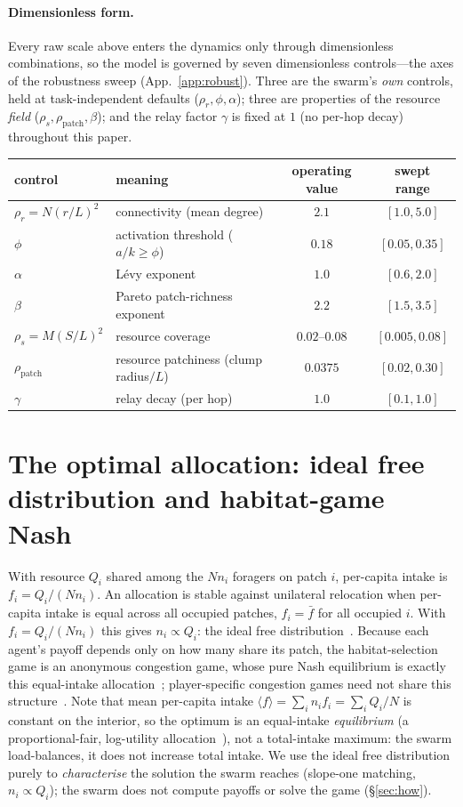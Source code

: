 \documentclass{article}
\begin{document}
\paragraph{Dimensionless form.} Every raw scale above enters the dynamics only through dimensionless
combinations, so the model is governed by seven dimensionless controls---the axes of the robustness sweep
(App.~\ref{app:robust}). Three are the swarm's \emph{own} controls, held at task-independent defaults
($\rho_r,\phi,\alpha$); three are properties of the resource \emph{field}
($\rho_s,\rho_{\mathrm{patch}},\beta$); and the relay factor $\gamma$ is fixed at $1$ (no per-hop decay)
throughout this paper.
\begin{center}{\small
\begin{tabular}{@{}llcc@{}}
\hline
control & meaning & operating value & swept range \\
\hline
$\rho_r=N(r/L)^2$ & connectivity (mean degree) & $2.1$ & $[1.0,5.0]$ \\
$\phi$ & activation threshold ($a/k\ge\phi$) & $0.18$ & $[0.05,0.35]$ \\
$\alpha$ & L\'evy exponent & $1.0$ & $[0.6,2.0]$ \\
$\beta$ & Pareto patch-richness exponent & $2.2$ & $[1.5,3.5]$ \\
$\rho_s=M(S/L)^2$ & resource coverage & $0.02$--$0.08$ & $[0.005,0.08]$ \\
$\rho_{\mathrm{patch}}$ & resource patchiness (clump radius$/L$) & $0.0375$ & $[0.02,0.30]$ \\
$\gamma$ & relay decay (per hop) & $1.0$ & $[0.1,1.0]$ \\
\hline
\end{tabular}}\end{center}

\section{The optimal allocation: ideal free distribution and habitat-game Nash}
\label{app:optimum}
With resource $Q_i$ shared among the $N n_i$ foragers on patch $i$, per-capita intake is $f_i=Q_i/(N n_i)$.
An allocation is stable against unilateral relocation when per-capita intake is equal across all occupied
patches, $f_i=\bar f$ for all occupied $i$. With $f_i=Q_i/(N n_i)$ this gives $n_i\propto Q_i$: the ideal free
distribution~\citep{fretwell1969ideal}. Because each agent's payoff depends only on how many share its patch,
the habitat-selection game is an anonymous congestion game, whose pure Nash equilibrium is exactly this
equal-intake allocation~\citep{rosenthal1973congestion,wardrop1952road}; player-specific congestion games need
not share this structure~\citep{milchtaich1996congestion}. Note that mean per-capita intake
$\langle f\rangle=\sum_i n_i f_i=\sum_i Q_i/N$ is constant on the interior, so the optimum is an equal-intake
\emph{equilibrium} (a proportional-fair, log-utility allocation~\citep{kelly1998rate}), not a total-intake
maximum: the swarm load-balances, it does not increase total intake. We use the ideal free distribution purely
to \emph{characterise} the solution the swarm reaches (slope-one matching, $n_i\propto Q_i$); the swarm does not
compute payoffs or solve the game (\S\ref{sec:how}).
\end{document}
